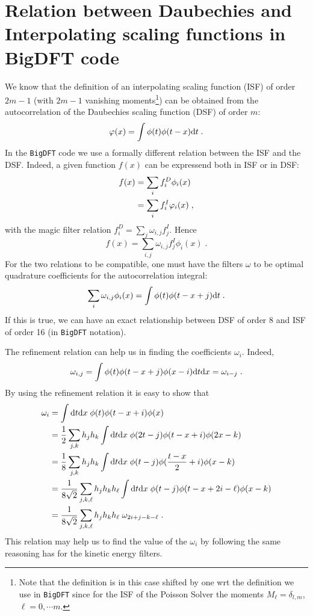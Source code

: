 \documentclass[12pt]{article}
\begin{document}
\section{Relation between Daubechies and Interpolating scaling functions in BigDFT code}
We know that the definition of an interpolating scaling function (ISF) of order $2m-1$ (with $2m-1$ vanishing moments\footnote{Note that the definition is in this case shifted by one wrt the definition we use in {\tt BigDFT} since for the ISF of the Poisson Solver the moments $M_\ell=\delta_{l,m}$, $\ell=0,\cdots m$.}) can be obtained from the autocorrelation of the Daubechies scaling function (DSF) of order $m$:
\begin{equation}
 \varphi(x) =\int \phi(t) \phi(t-x) {\rm d}t\;.
\end{equation}
In the {\tt BigDFT} code we use a formally different relation between the ISF and the DSF.
Indeed, a given function $f(x)$ can be expressend both in ISF or in DSF:
\begin{align}
 f(x)&= \sum_i f^D_i \phi_i(x) \notag \\
 &= \sum_i f^I_i \varphi_i(x)\;,
\end{align}
with the magic filter relation $f^D_i=\sum_j \omega_{i,j} f^I_j$. Hence
\begin{equation}
 f(x)=\sum_{i,j} \omega_{i,j} f^I_j \phi_i(x)\;.
\end{equation}
For the two relations to be compatible, one must have the filters $\omega$ to be optimal quadrature coefficients for the autocorrelation integral:
\begin{equation}
\sum_{i} \omega_{i,j} \phi_i(x) = \int \phi(t) \phi(t-x+j) {\rm d}t\;.
\end{equation}
If this is true, we can have an exact relationship between DSF of order 8 and ISF of order 16 (in {\tt BigDFT} notation).

The refinement relation can help us in finding the coefficients $\omega_i$.
Indeed,
\begin{equation}
 \omega_{i,j} = \int \phi(t) \phi(t-x+j) \phi(x-i) {\rm d}t {\rm d}x = \omega_{i-j}\;.
\end{equation}
By using the refinement relation it is easy to show that
\begin{align}
 \omega_{i}& = \int {\rm d}t {\rm d}x \; \phi(t) \phi(t-x+i) \phi(x) \notag \\
&= \frac{1}{2} \sum_{j,k} h_j h_k \int {\rm d}t {\rm d}x\; \phi(2t-j) \phi(t-x+i) \phi(2x-k) \notag \\
&= \frac{1}{8} \sum_{j,k} h_j h_k \int {\rm d}t {\rm d}x \;\phi(t-j) \phi(\frac{t-x}{2}+i) \phi(x-k) \notag \\
&= \frac{1}{8 \sqrt 2} \sum_{j,k,\ell} h_j h_k h_\ell \int {\rm d}t {\rm d}x\; \phi(t-j) \phi(t-x+2 i-\ell) \phi(x-k)  \\
 &= \frac{1}{8 \sqrt 2} \sum_{j,k,\ell} h_j h_k h_\ell\; \omega_{2i +j -k -\ell} \notag \;.
\end{align}
This relation may help us to find the value of the $\omega_i$ by following the same reasoning has for the kinetic energy filters.
\end{document}
